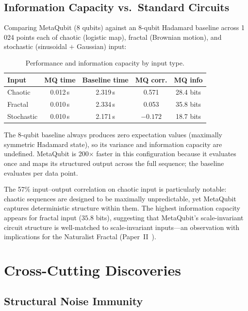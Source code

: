 \documentclass[twocolumn,amsmath,amssymb,prl]{revtex4-2}
\begin{document}
\subsection{Information Capacity vs.\ Standard Circuits}

Comparing MetaQubit (8 qubits) against an 8-qubit Hadamard baseline across
1\,024 points each of chaotic (logistic map), fractal (Brownian motion), and
stochastic (sinusoidal $+$ Gaussian) input:

\begin{table}[h]
\centering
\caption{Performance and information capacity by input type.}
\label{tab:performance}
\begin{tabular}{lcccc}
\toprule
Input & MQ time & Baseline time & MQ corr. & MQ info \\
\midrule
Chaotic    & 0.012\,s & 2.319\,s & 0.571 & 28.4 bits \\
Fractal    & 0.010\,s & 2.334\,s & 0.053 & 35.8 bits \\
Stochastic & 0.010\,s & 2.171\,s & $-0.172$ & 18.7 bits \\
\bottomrule
\end{tabular}
\end{table}

The 8-qubit baseline always produces zero expectation values (maximally
symmetric Hadamard state), so its variance and information capacity are
undefined.  MetaQubit is 200$\times$ faster in this configuration because it
evaluates once and maps its structured output across the full sequence; the
baseline evaluates per data point.

The 57\% input–output correlation on chaotic input is particularly notable:
chaotic sequences are designed to be maximally unpredictable, yet MetaQubit
captures deterministic structure within them.  The highest information capacity
appears for fractal input ($35.8$ bits), suggesting that MetaQubit's
scale-invariant circuit structure is well-matched to scale-invariant inputs—an
observation with implications for the Naturalist Fractal
(Paper~II~\cite{DemopoulosFractal}).

\section{Cross-Cutting Discoveries}
\label{sec:discoveries}

\subsection{Structural Noise Immunity}
\end{document}
